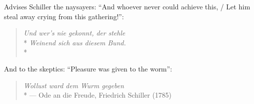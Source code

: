 	Advises Schiller the naysayers:
``And whoever never could achieve this, / Let him steal away crying from this gathering!'':
	\begin{verse}
		\emph{Und wer's nie gekonnt, der stehle}\\*
		\emph{Weinend sich aus diesem Bund.}\\*
	\end{verse}

	And to the skeptics:
``Pleasure was given to the worm'':
	\begin{verse}
		\emph{Wollust ward dem Wurm gegeben}\\*
		--- Ode an die Freude, Friedrich Schiller (1785)
	\end{verse} %
